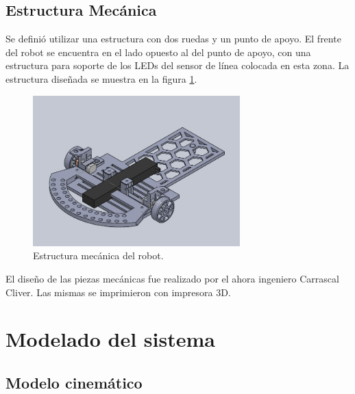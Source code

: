 \documentclass[10pt,conference,a4paper,onecolumn]{article}%
\begin{document}
\subsection{Estructura Mecánica}
Se definió utilizar una estructura con dos ruedas y un punto de apoyo. El frente del robot se encuentra en el lado opuesto al del punto de apoyo, con una estructura para soporte de los LEDs del sensor de línea colocada en esta zona. La estructura diseñada se muestra en la figura \ref{fig:estructuraRobot}.
\begin{figure}[h] %
\centering
\includegraphics[width=8cm]{./imagenes/estructuraCompleta.png}
\caption{Estructura mecánica del robot.}
\label{fig:estructuraRobot}
\end{figure}
El diseño de las piezas mecánicas fue realizado por el ahora ingeniero Carrascal Cliver. Las mismas se imprimieron con impresora 3D.
\section{Modelado del sistema} \label{sec:Modelado_del_sistema}
 

\subsection{Modelo cinemático}
\label{modelo cinematico}
\end{document}
